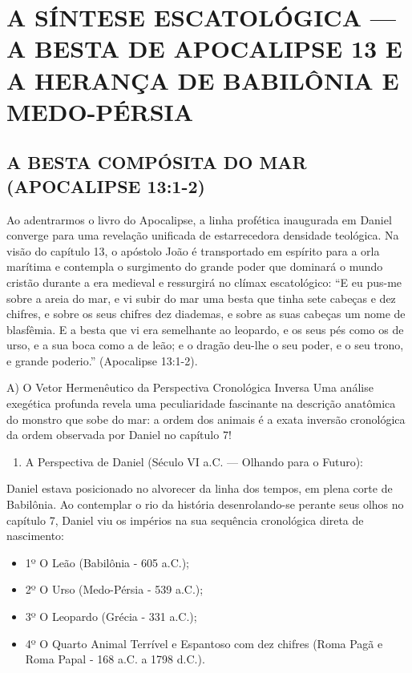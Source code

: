 \section{A SÍNTESE ESCATOLÓGICA — A BESTA DE APOCALIPSE 13 E A HERANÇA DE BABILÔNIA E MEDO-PÉRSIA}



\subsection{A BESTA COMPÓSITA DO MAR (APOCALIPSE 13:1-2)}


Ao adentrarmos o livro do Apocalipse, a linha profética inaugurada em Daniel converge para uma revelação unificada de estarrecedora densidade teológica. Na visão do capítulo 13, o apóstolo João é transportado em espírito para a orla marítima e contempla o surgimento do grande poder que dominará o mundo cristão durante a era medieval e ressurgirá no clímax escatológico:
``E eu pus-me sobre a areia do mar, e vi subir do mar uma besta que tinha sete cabeças e dez chifres, e sobre os seus chifres dez diademas, e sobre as suas cabeças um nome de blasfêmia. E a besta que vi era semelhante ao leopardo, e os seus pés como os de urso, e a sua boca como a de leão; e o dragão deu-lhe o seu poder, e o seu trono, e grande poderio.'' (Apocalipse 13:1-2).

A) O Vetor Hermenêutico da Perspectiva Cronológica Inversa
Uma análise exegética profunda revela uma peculiaridade fascinante na descrição anatômica do monstro que sobe do mar: a ordem dos animais é a exata inversão cronológica da ordem observada por Daniel no capítulo 7!

\begin{enumerate}
  \item A Perspectiva de Daniel (Século VI a.C. — Olhando para o Futuro):
\end{enumerate}

Daniel estava posicionado no alvorecer da linha dos tempos, em plena corte de Babilônia. Ao contemplar o rio da história desenrolando-se perante seus olhos no capítulo 7, Daniel viu os impérios na sua sequência cronológica direta de nascimento:
\begin{itemize}
  \item 1º O Leão (Babilônia - 605 a.C.);
  \item 2º O Urso (Medo-Pérsia - 539 a.C.);
  \item 3º O Leopardo (Grécia - 331 a.C.);
  \item 4º O Quarto Animal Terrível e Espantoso com dez chifres (Roma Pagã e Roma Papal - 168 a.C. a 1798 d.C.).
\end{itemize}


